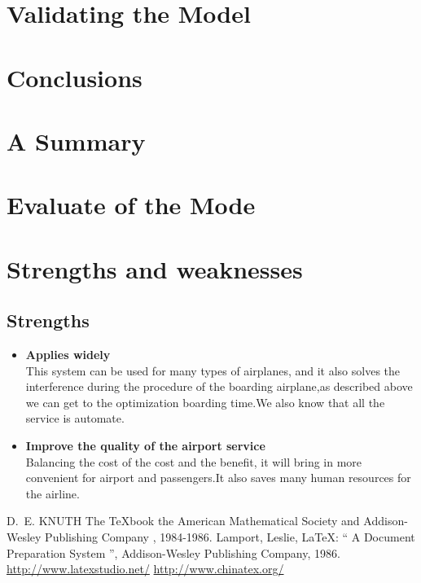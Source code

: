 \documentclass{mcmthesis}
\begin{document}
\section{Validating the Model}
\lipsum[9]

\section{Conclusions}
\lipsum[6]

\section{A Summary}
\lipsum[6]

\section{Evaluate of the Mode}

\section{Strengths and weaknesses}
\lipsum[12]

\subsection{Strengths}
\begin{itemize}
\item \textbf{Applies widely}\\
This  system can be used for many types of airplanes, and it also
solves the interference during  the procedure of the boarding
airplane,as described above we can get to the  optimization
boarding time.We also know that all the service is automate.
\item \textbf{Improve the quality of the airport service}\\
Balancing the cost of the cost and the benefit, it will bring in
more convenient  for airport and passengers.It also saves many
human resources for the airline. 
\end{itemize}


\begin{thebibliography}{99}
 D.~E. KNUTH   The \TeX{}book  the American
Mathematical Society and Addison-Wesley
Publishing Company , 1984-1986.
Lamport, Leslie,  \LaTeX{}: `` A Document Preparation System '',
Addison-Wesley Publishing Company, 1986.
\url{http://www.latexstudio.net/}
\url{http://www.chinatex.org/}
\end{thebibliography}
\end{document}
